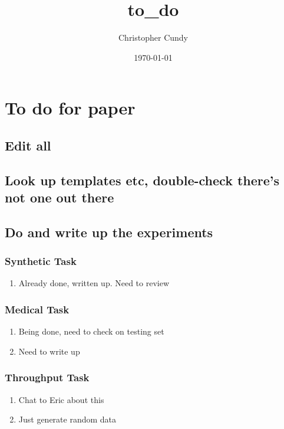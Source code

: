 \documentclass[11pt]{article}
\author{Christopher Cundy}
\date{\today}
\title{to\_do}
\begin{document}
\maketitle
\tableofcontents

\section{To do for paper}
\label{sec-1}
\subsection{Edit all}
\label{sec-1-1}
\subsection{Look up templates etc, double-check there's not one out there}
\label{sec-1-2}
\subsection{Do and write up the experiments}
\label{sec-1-3}
\subsubsection{Synthetic Task}
\label{sec-1-3-1}
\begin{enumerate}
\item Already done, written up. Need to review
\label{sec-1-3-1-1}
\end{enumerate}
\subsubsection{Medical Task}
\label{sec-1-3-2}
\begin{enumerate}
\item Being done, need to check on testing set
\label{sec-1-3-2-1}
\item Need to write up
\label{sec-1-3-2-2}
\end{enumerate}
\subsubsection{Throughput Task}
\label{sec-1-3-3}
\begin{enumerate}
\item Chat to Eric about this
\label{sec-1-3-3-1}
\item Just generate random data
\label{sec-1-3-3-2}
\end{enumerate}
\end{document}
